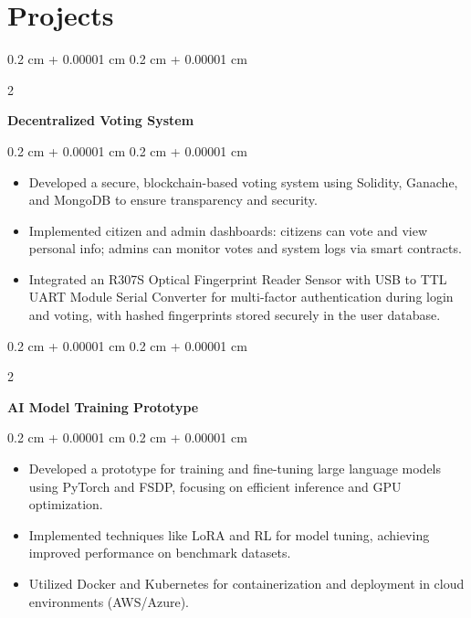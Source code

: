 \documentclass[10pt, letterpaper]{article}
\newenvironment{highlights}{
    \begin{itemize}[
        topsep=0.10 cm,
        parsep=0.10 cm,
        partopsep=0pt,
        itemsep=0pt,
        leftmargin=0.4 cm + 10pt
    ]
}{
    \end{itemize}
} %
\newenvironment{onecolentry}{
    \begin{adjustwidth}{
        0.2 cm + 0.00001 cm
    }{
        0.2 cm + 0.00001 cm
    }
}{
    \end{adjustwidth}
} %
\newenvironment{twocolentry}[2][]{
    \onecolentry
    \def\secondColumn{#2}
    \setcolumnwidth{\fill, 4.5 cm}
    \begin{paracol}{2}
}{
    \switchcolumn \raggedleft \secondColumn
    \end{paracol}
    \endonecolentry
} %
\let\hrefWithoutArrow\href
\renewcommand{\href}[2]{\hrefWithoutArrow{#1}{\ifthenelse{\equal{#2}{}}{ }{#2 }\raisebox{.15ex}{\footnotesize \faExternalLink*}}}
\begin{document}
    \section{Projects}
    \begin{twocolentry}{}
        \textbf{Decentralized Voting System} \href{https://github.com/deadhearth01/decentralized-voting-system-R307S}{\faGithub}
    \end{twocolentry}
    \vspace{0.10 cm}
    \begin{onecolentry}
        \begin{highlights}
            \item Developed a secure, blockchain-based voting system using Solidity, Ganache, and MongoDB to ensure transparency and security.
            \item Implemented citizen and admin dashboards: citizens can vote and view personal info; admins can monitor votes and system logs via smart contracts.
            \item Integrated an R307S Optical Fingerprint Reader Sensor with USB to TTL UART Module Serial Converter for multi-factor authentication during login and voting, with hashed fingerprints stored securely in the user database.
        \end{highlights}
    \end{onecolentry}
    \vspace{0.10 cm}
    \begin{twocolentry}{}
        \textbf{AI Model Training Prototype} \href{https://github.com/deadhearth01/ai-model-prototype}{\faGithub}
    \end{twocolentry}
    \vspace{0.10 cm}
    \begin{onecolentry}
        \begin{highlights}
            \item Developed a prototype for training and fine-tuning large language models using PyTorch and FSDP, focusing on efficient inference and GPU optimization.
            \item Implemented techniques like LoRA and RL for model tuning, achieving improved performance on benchmark datasets.
            \item Utilized Docker and Kubernetes for containerization and deployment in cloud environments (AWS/Azure).
        \end{highlights}
    \end{onecolentry}
\end{document}
